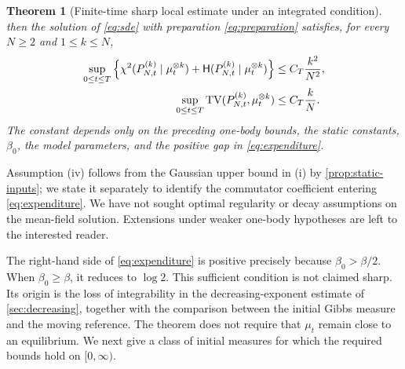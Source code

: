 \documentclass[11pt,reqno]{amsart}
\numberwithin{equation}{section}
\theoremstyle{plain}
\newtheorem{thm}{Theorem}[section]
\theoremstyle{remark}
\newcommand{\Hr}{\mathsf H}\newcommand{\dd}{\,\mathrm d}
\begin{document}
\begin{thm}[Finite-time sharp local estimate under an integrated condition]
\begin{equation}
\end{equation}
then the solution of \eqref{eq:sde} with preparation \eqref{eq:preparation} satisfies, for every $N\ge2$ and $1\le k\le N$,
\begin{align}
 \sup_{0\le t\le T}\left\{\chi^2(P_{N,t}^{(k)}\mid\mu_t^{\otimes k})+
              \Hr(P_{N,t}^{(k)}\mid\mu_t^{\otimes k})\right\}
       &\le C_T\frac{k^2}{N^2},\label{eq:finite-rates}\\
 \sup_{0\le t\le T}\TV(P_{N,t}^{(k)},\mu_t^{\otimes k})
       &\le C_T\frac{k}{N}.\label{eq:intro-finite-TV}
\end{align}
The constant depends only on the preceding one-body bounds, the static constants, $\beta_0$, the model parameters, and the positive gap in \eqref{eq:expenditure}.
\end{thm}



Assumption \textup{(iv)} follows from the Gaussian upper bound in \textup{(i)} by \cref{prop:static-inputs}; we state it separately to identify the commutator coefficient entering \eqref{eq:expenditure}. We have not sought optimal regularity or decay assumptions on the mean-field solution. Extensions under weaker one-body hypotheses are left to the interested reader.



The right-hand side of \eqref{eq:expenditure} is positive precisely because $\beta_0>\beta/2$. When $\beta_0\ge\beta$, it reduces to $\log2$. This sufficient condition is not claimed sharp. Its origin is the loss of integrability in the decreasing-exponent estimate of \cref{sec:decreasing}, together with the comparison between the initial Gibbs measure and the moving reference. The theorem does not require that $\mu_t$ remain close to an equilibrium. We next give a class of initial measures for which the required bounds hold on $[0,\infty)$.
\end{document}
